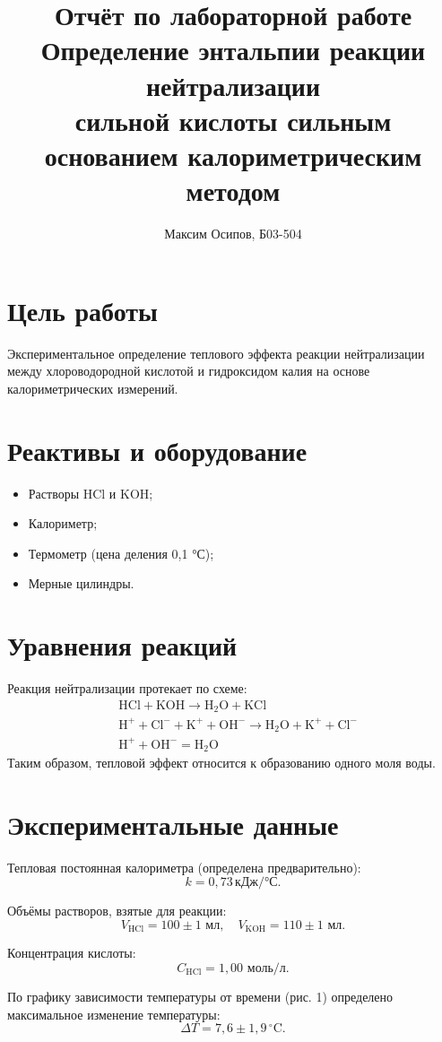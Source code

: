 \documentclass[a4paper,12pt]{article}
\title{Отчёт по лабораторной работе \\ Определение энтальпии реакции нейтрализации \\ сильной кислоты сильным основанием калориметрическим методом}
\author{Максим Осипов, Б03-504}
\date{}
\begin{document}
\maketitle

\section*{Цель работы}
Экспериментальное определение теплового эффекта реакции нейтрализации между хлороводородной кислотой и гидроксидом калия на основе калориметрических измерений.

\section*{Реактивы и оборудование}
\begin{itemize}
    \item Растворы HCl и KOH;
    \item Калориметр;
    \item Термометр (цена деления 0,1 °С);
    \item Мерные цилиндры.
\end{itemize}

\section*{Уравнения реакций}
Реакция нейтрализации протекает по схеме:
\[
\begin{aligned}
&\text{HCl} + \text{KOH} \to \text{H}_2\text{O} + \text{KCl} \\
&\text{H}^+ + \text{Cl}^- + \text{K}^+ + \text{OH}^- \to \text{H}_2\text{O} + \text{K}^+ + \text{Cl}^- \\
&\text{H}^+ + \text{OH}^- = \text{H}_2\text{O}
\end{aligned}
\tag{1}
\]
Таким образом, тепловой эффект относится к образованию одного моля воды.

\section*{Экспериментальные данные}
Тепловая постоянная калориметра (определена предварительно):
\[
k = 0,73 \, \text{кДж/°С}.
\]

Объёмы растворов, взятые для реакции:
\[
V_{\text{HCl}} = 100 \pm 1 \text{ мл}, \quad V_{\text{KOH}} = 110 \pm 1 \text{ мл}.
\]

Концентрация кислоты:
\[
C_{\text{HCl}} = 1,00 \text{ моль/л}.
\]

По графику зависимости температуры от времени (рис. 1) определено максимальное изменение температуры:
\[
\Delta T = 7,6 \pm 1,9 \, ^\circ \text{C}.
\]
\end{document}
